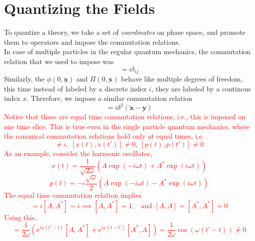 \documentclass[11pt, notitlepage]{report}
\newcommand{\e}{\mathrm{e}}
\newcommand{\w}{\omega}
\numberwithin{equation}{section}
\begin{document}
    \section{Quantizing the Fields}
    To quantize a theory, we take a set of \textit{coordinates} on phase space, and promote them to operators and impose the commutation relations.\\
    In case of multiple particles in the regular quantum mechanics, the commutation relation that we used to impose was 
    \begin{equation*}
        [x_i, p_j] = i\delta_{ij}
    \end{equation*}
    Similarly, the \(\phi(0, \textbf{x})\) and \(\Pi(0, \textbf{x})\) behave like multiple degrees of freedom, this time instead of labeled by a discrete index \(i\), they are labeled by a continous index \(x\). Therefore, we impose a similar commutation relation
    \begin{equation}
        [\phi(t, \textbf{x}), \Pi(t, \textbf{y})] = i\delta^3(\textbf{x} - \textbf{y})
    \end{equation} 
    \textcolor{red}{
    Notice that these are equal time commutation relations, i.e., this is imposed on one time slice. This is true even in the single particle quantum mechanics, where the canonical commutation relations hold only at equal times, i.e. 
    \begin{equation*}
        [x(t), p(t')] \ne i,~[x(t), x(t')] \ne 0,~[p(t), p(t')]\ne 0
    \end{equation*}
    As an example, consider the harmonic oscillator, 
    \begin{equation*}
        x(t) = \frac{1}{\sqrt{2\w}}(A\exp(-i\w t) + A^*\exp(i\w t))
    \end{equation*}
    \begin{equation*}
        p(t) = -i\frac{\sqrt{\w}}{2}(A\exp(-i\w t) - A^*\exp(i\w t))
    \end{equation*}
    The equal time commutation relation implies 
    \begin{equation*}
        [x(0), p(0)] = i[A, A^*] = i \implies [A, A^*] = 1\text{,~~ and } [A, A] = [A^*,A^*] = 0 
    \end{equation*}
    Using this, 
    \begin{equation*}
        [x(t), x(t')] = \frac{1}{2\w}\left(\e^{i\w(t'-t)}[A, A^*] + \e^{i\w(t-t')}[A^*, A]\right) = \frac{1}{2\w}\cos(\w(t'-t)) \ne 0
        \tag{\(\diamondsuit\)}
        \label{eq:time_comm}
    \end{equation*}
    }
\end{document}
